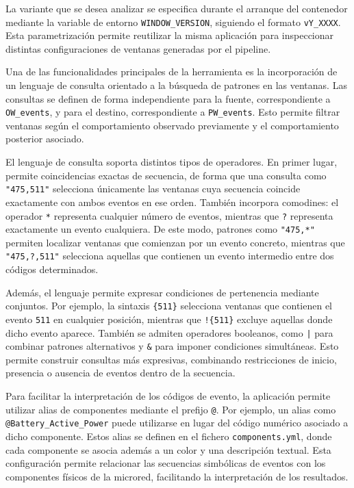 La variante que se desea analizar se especifica durante el arranque del contenedor mediante la variable de entorno \texttt{WINDOW\_VERSION}, siguiendo el formato \texttt{vY\_XXXX}. Esta parametrización permite reutilizar la misma aplicación para inspeccionar distintas configuraciones de ventanas generadas por el pipeline.

Una de las funcionalidades principales de la herramienta es la incorporación de un lenguaje de consulta orientado a la búsqueda de patrones en las ventanas. Las consultas se definen de forma independiente para la fuente, correspondiente a \texttt{OW\_events}, y para el destino, correspondiente a \texttt{PW\_events}. Esto permite filtrar ventanas según el comportamiento observado previamente y el comportamiento posterior asociado.

El lenguaje de consulta soporta distintos tipos de operadores. En primer lugar, permite coincidencias exactas de secuencia, de forma que una consulta como \texttt{"475,511"} selecciona únicamente las ventanas cuya secuencia coincide exactamente con ambos eventos en ese orden. También incorpora comodines: el operador \texttt{*} representa cualquier número de eventos, mientras que \texttt{?} representa exactamente un evento cualquiera. De este modo, patrones como \texttt{"475,*"} permiten localizar ventanas que comienzan por un evento concreto, mientras que \texttt{"475,?,511"} selecciona aquellas que contienen un evento intermedio entre dos códigos determinados.

Además, el lenguaje permite expresar condiciones de pertenencia mediante conjuntos. Por ejemplo, la sintaxis \texttt{\{511\}} selecciona ventanas que contienen el evento \texttt{511} en cualquier posición, mientras que \texttt{!\{511\}} excluye aquellas donde dicho evento aparece. También se admiten operadores booleanos, como \texttt{|} para combinar patrones alternativos y \texttt{\&} para imponer condiciones simultáneas. Esto permite construir consultas más expresivas, combinando restricciones de inicio, presencia o ausencia de eventos dentro de la secuencia.

Para facilitar la interpretación de los códigos de evento, la aplicación permite utilizar alias de componentes mediante el prefijo \texttt{@}. Por ejemplo, un alias como \texttt{@Battery\_Active\_Power} puede utilizarse en lugar del código numérico asociado a dicho componente. Estos alias se definen en el fichero \texttt{components.yml}, donde cada componente se asocia además a un color y una descripción textual. Esta configuración permite relacionar las secuencias simbólicas de eventos con los componentes físicos de la microred, facilitando la interpretación de los resultados.

